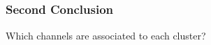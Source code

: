 \documentclass[11pt]{article}
\begin{document}
    \begin{center}
    \end{center}
    { \hspace*{\fill} \\}
    
    \begin{center}
    \end{center}
    { \hspace*{\fill} \\}
    
    \begin{center}
    \end{center}
    { \hspace*{\fill} \\}
    
    \begin{center}
    \end{center}
    { \hspace*{\fill} \\}
    
    \subsubsection{Second Conclusion}\label{second-conclusion}

Which channels are associated to each cluster?
\end{document}
